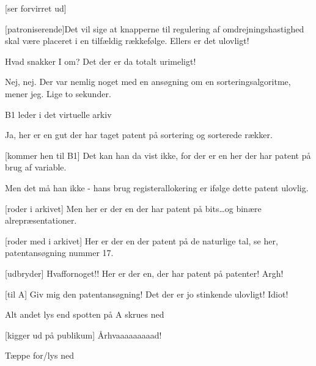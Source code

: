 \documentclass[a4paper,11pt]{article}
\begin{document}
\begin{sketch}
[ser forvirret ud]

[patroniserende]Det vil sige at knapperne til regulering af
omdrejningshastighed skal være placeret i en tilfældig rækkefølge.
Ellers er det ulovligt!

 Hvad snakker I om? Det der er da totalt urimeligt!

 Nej, nej. Der var nemlig noget med en ansøgning om en
sorteringsalgoritme, mener jeg. Lige to sekunder.

\scene B1 leder i det virtuelle arkiv

 Ja, her er en gut der har taget patent på sortering og
sorterede rækker.

[kommer hen til B1] Det kan han da vist ikke, for der er en
her der har patent på brug af variable. 

 Men det må han ikke - hans brug registerallokering er ifølge
dette patent ulovlig. 

[roder i arkivet] Men her er der en der har patent på
bits\ldots og binære alrepræsentationer.

[roder med i arkivet] Her er der en der patent på de
naturlige tal, se her, patentansøgning nummer 17.

[udbryder] Hvaffornoget!! Her er der en, der har patent på
patenter! Argh!

[til A] Giv mig den patentansøgning! Det der er jo stinkende
ulovligt!  Idiot!

\scene Alt andet lys end spotten på A skrues ned

[kigger ud på publikum] Århvaaaaaaaaad!

\scene Tæppe for/lys ned

\end{sketch}
\end{document}
